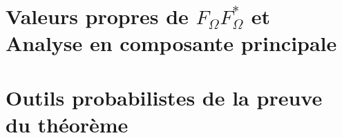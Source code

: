 \section{Valeurs propres de $F_\Omega F_\Omega ^*$ et Analyse en composante principale}

\section{Outils probabilistes de la preuve du théorème}
